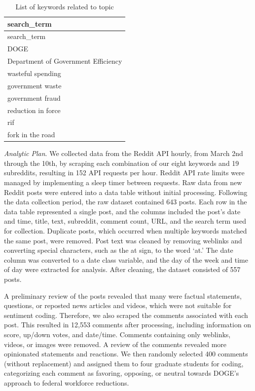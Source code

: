 \documentclass[
  12pt]{article}
\begin{document}
\begin{longtable}[]{@{}l@{}}
\caption{List of keywords related to topic}\tabularnewline
\toprule\noalign{}
search\_term \\
\midrule\noalign{}
\endfirsthead
\toprule\noalign{}
search\_term \\
\midrule\noalign{}
\endhead
\bottomrule\noalign{}
\endlastfoot
DOGE \\
Department of Government Efficiency \\
wasteful spending \\
government waste \\
government fraud \\
reduction in force \\
rif \\
fork in the road \\
\end{longtable}

\emph{Analytic Plan}. We collected data from the Reddit API hourly, from
March 2nd through the 10th, by scraping each combination of our eight
keywords and 19 subreddits, resulting in 152 API requests per hour.
Reddit API rate limits were managed by implementing a sleep timer
between requests. Raw data from new Reddit posts were entered into a
data table without initial processing. Following the data collection
period, the raw dataset contained 643 posts. Each row in the data table
represented a single post, and the columns included the post's date and
time, title, text, subreddit, comment count, URL, and the search term
used for collection. Duplicate posts, which occurred when multiple
keywords matched the same post, were removed. Post text was cleaned by
removing weblinks and converting special characters, such as the at
sign, to the word `at.' The date column was converted to a date class
variable, and the day of the week and time of day were extracted for
analysis. After cleaning, the dataset consisted of 557 posts.

A preliminary review of the posts revealed that many were factual
statements, questions, or reposted news articles and videos, which were
not suitable for sentiment coding. Therefore, we also scraped the
comments associated with each post. This resulted in 12,553 comments
after processing, including information on score, up/down votes, and
date/time. Comments containing only weblinks, videos, or images were
removed. A review of the comments revealed more opinionated statements
and reactions. We then randomly selected 400 comments (without
replacement) and assigned them to four graduate students for coding,
categorizing each comment as favoring, opposing, or neutral towards
DOGE's approach to federal workforce reductions.
\end{document}
